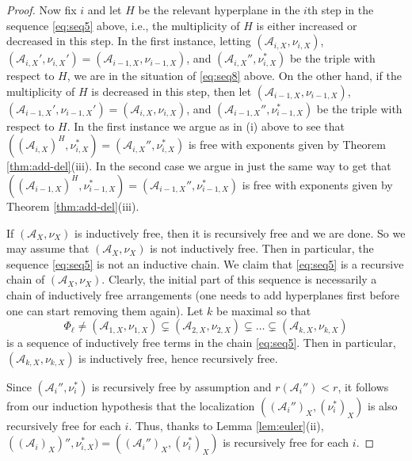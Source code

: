 \begin{proof}
Now fix $i$ and let $H$ be the relevant 
hyperplane in the $i$th step in the sequence \eqref{eq:seq5} above,
i.e., the multiplicity of $H$ is either increased or decreased in this step.
In the first instance, letting 
$({{\mathcal A}}_{i,X}, \nu_{i,X})$, $({{\mathcal A}}_{i,X}', \nu_{i,X}') = ({{\mathcal A}}_{i-1,X}, \nu_{i-1,X})$, 
and $({{\mathcal A}}_{i,X}'', \nu_{i,X}^*)$
be the triple with respect to $H$, 
we are in the situation of \eqref{eq:seq8} above.
On the other hand,
if the multiplicity of $H$ is decreased in this step, then
let 
$({{\mathcal A}}_{i-1,X}, \nu_{i-1,X})$, $({{\mathcal A}}_{i-1,X}', \nu_{i-1,X}') 
= ({{\mathcal A}}_{i,X}, \nu_{i,X})$, 
and $({{\mathcal A}}_{i-1,X}'', \nu_{i-1,X}^*)$
be the triple with respect to $H$.
In the first instance we argue as in (i) above to 
see that 
$(({{\mathcal A}}_{i,X})^H, \nu_{i,X}^*) = ({{\mathcal A}}_{i,X}'', \nu_{i,X}^*)$
is free with exponents given by Theorem \ref{thm:add-del}(iii).
In the second case we argue in just the same way to get that 
$(({{\mathcal A}}_{i-1,X})^H, \nu_{i-1,X}^*) = ({{\mathcal A}}_{i-1,X}'', \nu_{i-1,X}^*)$
is free with exponents given by Theorem \ref{thm:add-del}(iii).

If $({{\mathcal A}}_X, \nu_X)$ is inductively free, then it is 
recursively free and we are done. So we may assume that 
$({{\mathcal A}}_X, \nu_X)$ is not inductively free. 
Then in particular, the sequence \eqref{eq:seq5}
is not an inductive chain.
We claim that \eqref{eq:seq5} is a recursive chain of $({{\mathcal A}}_X, \nu_X)$.
Clearly, the initial part of this sequence is
necessarily a chain of inductively free arrangements 
(one needs to add hyperplanes first before one can start removing them 
again).
Let $k$ be maximal so that 
\begin{equation}
\label{eq:seq6}
\Phi_\ell \ne 
\left({{\mathcal A}}_{1,X}, \nu_{1,X}\right) \subsetneq \left({{\mathcal A}}_{2,X}, \nu_{2,X}\right) 
\subsetneq  \ldots \subsetneq \left({{\mathcal A}}_{k,X}, \nu_{k,X}\right)
\end{equation}
is a sequence of inductively free terms in the 
chain \eqref{eq:seq5}.
Then in particular, $({{\mathcal A}}_{k,X}, \nu_{k,X})$ is inductively 
free, hence recursively free.

Since $({{\mathcal A}}_i'', \nu_i^*)$ is recursively free by assumption
and $r({{\mathcal A}}_i'') < r$, it follows from our induction hypothesis
that the localization 
$(({{\mathcal A}}_i'')_X, (\nu_{i}^*)_X)$ is also recursively
free for each $i$.
Thus, thanks to Lemma \ref{lem:euler}(ii),
$(({{\mathcal A}}_i)_X)'', \nu_{i,X}^*) = (({{\mathcal A}}_i'')_X, (\nu_{i}^*)_X)$ 
is recursively free for each $i$.


\end{proof}
